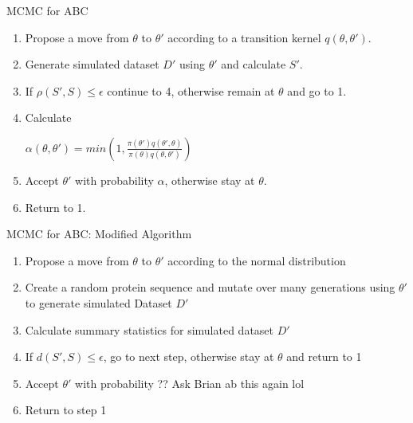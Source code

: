 \documentclass{beamer}
\begin{document}
	\begin{frame}{MCMC for ABC}
		
		\begin{enumerate}
			\item Propose a move from $\theta$ to $\theta'$ according to a transition kernel $q(\theta,\theta')$.
			\item Generate simulated dataset $D'$ using $\theta'$ and calculate $S'$.
			\item If $\rho(S', S) \le \epsilon$ continue to 4, otherwise remain at $\theta$ and go to 1.
			\item Calculate \newline \begin{center}$\alpha(\theta, \theta') = min(1, \frac{\pi(\theta')q(\theta',\theta)}{\pi(\theta)q(\theta, \theta')})$ \end{center}
			\item Accept $\theta'$ with probability $\alpha$, otherwise stay at $\theta$.
			\item Return to 1.
		\end{enumerate}
	
	\end{frame}

	\begin{frame}{MCMC for ABC: Modified Algorithm}
	
		\begin{enumerate}
			\item Propose a move from $\theta$ to $\theta'$ according to the normal distribution \pause
			\item Create a random protein sequence and mutate over many generations using $\theta'$ to generate simulated Dataset $D'$ \pause
			\item Calculate summary statistics for simulated dataset $D'$ \pause
			\item If $d(S',S) \le \epsilon$, go to next step, otherwise stay at $\theta$ and return to 1 \pause
			\item Accept $\theta'$ with probability ?? Ask Brian ab this again lol \pause
			\item Return to step 1
		\end{enumerate}
	
	\end{frame}
\end{document}
